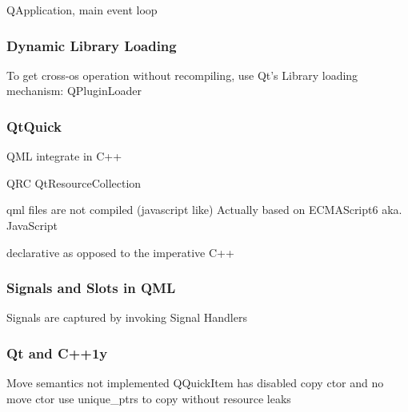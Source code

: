 QApplication, main event loop

\subsubsection{Dynamic Library Loading}

To get cross-\gls{os} operation without recompiling, use Qt's Library loading mechanism: QPluginLoader

\subsubsection{QtQuick}
QML integrate in C++

QRC QtResourceCollection

qml files are not compiled (javascript like)
Actually based on ECMAScript6 aka. JavaScript

declarative as opposed to the imperative  C++

\subsubsection{Signals and Slots in QML}
Signals are captured by invoking Signal Handlers

\subsubsection{Qt and C++1y}
Move semantics not implemented
QQuickItem has disabled copy ctor and no move ctor
use unique\_ptrs to copy without resource leaks
